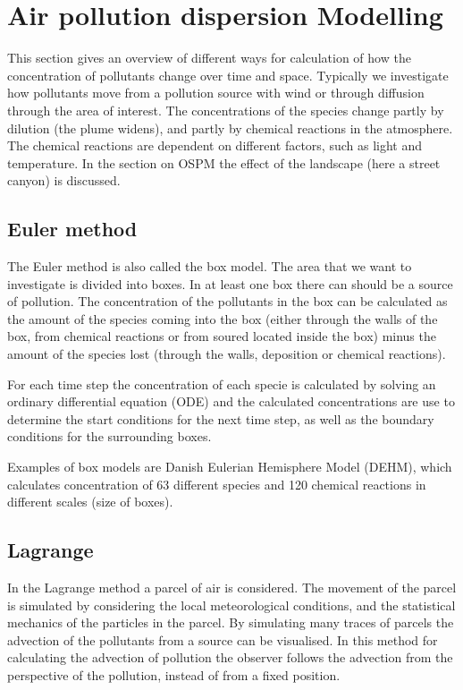 \section{Air pollution dispersion Modelling}
This section gives an overview of different ways for calculation of how the concentration of pollutants change over time and space. Typically we investigate how pollutants move from a pollution source with wind or through diffusion through the area of interest. The concentrations of the species change partly by dilution (the plume widens), and partly by chemical reactions in the atmosphere. The chemical reactions are dependent on different factors, such as light and temperature. In the section on OSPM the effect of the landscape (here a street canyon) is discussed.

\subsection{Euler method}
The Euler method is also called the box model. The area that we want to investigate is divided into boxes. In at least one box there can should be a source of pollution. The concentration of the pollutants in the box can be calculated as the amount of the species coming into the box (either through the walls of the box, from chemical reactions or from soured located inside the box) minus the amount of the species lost (through the walls, deposition or chemical reactions).

For each time step the concentration of each specie is calculated by solving an ordinary differential equation (ODE) and the calculated concentrations are use to determine the start conditions for the next time step, as well as the boundary conditions for the surrounding boxes.

Examples of box models are Danish Eulerian Hemisphere Model (DEHM), which calculates concentration of 63 different species and 120 chemical reactions in different scales (size of boxes).

\subsection{Lagrange}
In the Lagrange method a parcel of air is considered. The movement of the parcel is simulated by considering the local meteorological conditions, and the statistical mechanics of the particles in the parcel. By simulating many traces of parcels the advection of the pollutants from a source can be visualised. In this method for calculating the advection of pollution the observer follows the advection from the perspective of the pollution, instead of from a fixed position.


